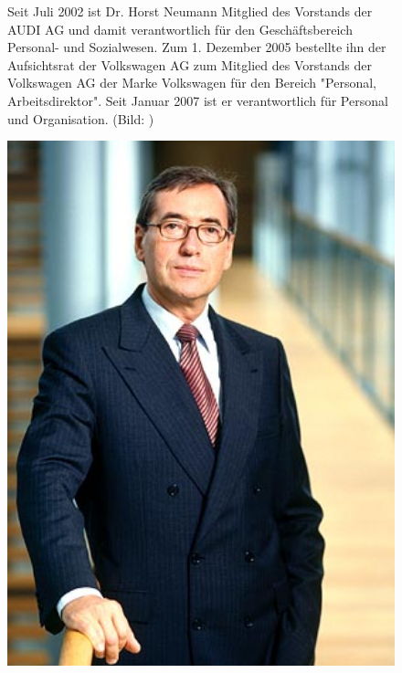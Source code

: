 \documentclass[12pt]{article}
\begin{document}
\begin{figure}[here!]
	\centering
	\begin{minipage}[h]{0.65\textwidth}
		Seit Juli 2002 ist Dr. Horst Neumann Mitglied des Vorstands der AUDI AG und damit verantwortlich für den Geschäftsbereich Personal- und Sozialwesen. Zum 1. Dezember 2005 bestellte ihn der Aufsichtsrat der Volkswagen AG zum Mitglied des Vorstands der Volkswagen AG  der Marke Volkswagen für den Bereich "Personal, Arbeitsdirektor". Seit Januar 2007 ist er verantwortlich für Personal und Organisation. (Bild: \cite{hmpic} )
	\end{minipage}
	\begin{minipage}[h]{0.10\textwidth}
		\hspace{1cm} 
	\end{minipage}
	\begin{minipage}[h]{0.20\textwidth}
		\centering
		\includegraphics[width=1.0\textwidth]{images/HorstNeumann.jpg}
		\label{fig:vorstandvw5}
	\end{minipage}
\end{figure}
\end{document}
